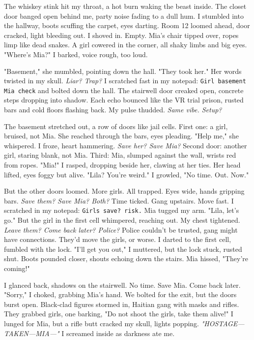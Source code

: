 \documentclass[12pt,oneside]{book} %
\newcommand{\note}[1]{\texttt{#1}}
\begin{document}
The whiskey stink hit my throat, a hot burn waking the beast inside. The closet door banged open behind me, party noise fading to a dull hum. I stumbled into the hallway, boots scuffing the carpet, eyes darting. Room 12 loomed ahead, door cracked, light bleeding out. I shoved in. Empty. Mia’s chair tipped over, ropes limp like dead snakes. A girl cowered in the corner, all shaky limbs and big eyes. "Where’s Mia?" I barked, voice rough, too loud.

"Basement," she mumbled, pointing down the hall. "They took her." Her words twisted in my skull. \textit{Liar? Trap?} I scratched fast in my notepad: \note{Girl basement Mia check} and bolted down the hall. The stairwell door creaked open, concrete steps dropping into shadow. Each echo bounced like the VR trial prison, rusted bars and cold floors flashing back. My pulse thudded. \textit{Same vibe. Setup?}

The basement stretched out, a row of doors like jail cells. First one: a girl, bruised, not Mia. She reached through the bars, eyes pleading. "Help me," she whispered. I froze, heart hammering. \textit{Save her? Save Mia?} Second door: another girl, staring blank, not Mia. Third: Mia, slumped against the wall, wrists red from ropes. "Mia!" I rasped, dropping beside her, clawing at her ties. Her head lifted, eyes foggy but alive. "\textnormal{Lila}? You’re weird." I growled, "No time. Out. Now."

But the other doors loomed. More girls. All trapped. Eyes wide, hands gripping bars. \textit{Save them? Save Mia? Both?} Time ticked. Gang upstairs. Move fast. I scratched in my notepad: \note{Girls save? risk.} Mia tugged my arm. "\textnormal{Lila}, let’s go." But the girl in the first cell whimpered, reaching out. My chest tightened. \textit{Leave them? Come back later? Police?} Police couldn’t be trusted, gang might have connections. They’d move the girls, or worse. I darted to the first cell, fumbled with the lock. "I’ll get you out," I muttered, but the lock stuck, rusted shut. Boots pounded closer, shouts echoing down the stairs. Mia hissed, "They’re coming!"

I glanced back, shadows on the stairwell. No time. Save Mia. Come back later. "Sorry," I choked, grabbing Mia’s hand. We bolted for the exit, but the doors burst open. Black-clad figures stormed in, Haitian gang with masks and rifles. They grabbed girls, one barking, "Do not shoot the girls, take them alive!" I lunged for Mia, but a rifle butt cracked my skull, lights popping. \textit{"HOSTAGE—TAKEN—MIA—"} I screamed inside as darkness ate me.
\end{document}
